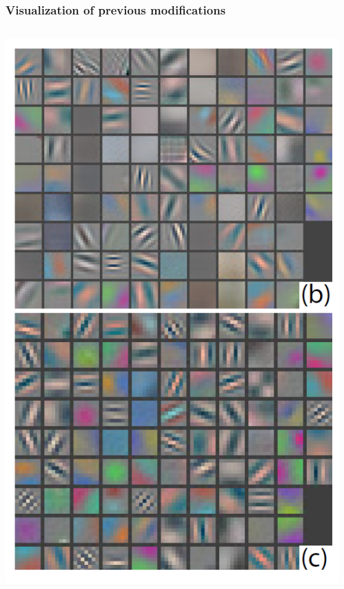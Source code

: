 \begin{frame}
	\frametitle{Visualization of previous modifications}
	
		\begin{columns} %
		\begin{column}{.6\textwidth}
			\begin{center}
			\includegraphics[scale=0.6]{figs/vizualization_cnn}
		\end{center}
		\end{column}%
		
		
		
		\begin{column}{.4\textwidth}
			

\end{column}
\end{columns}
\end{frame}
